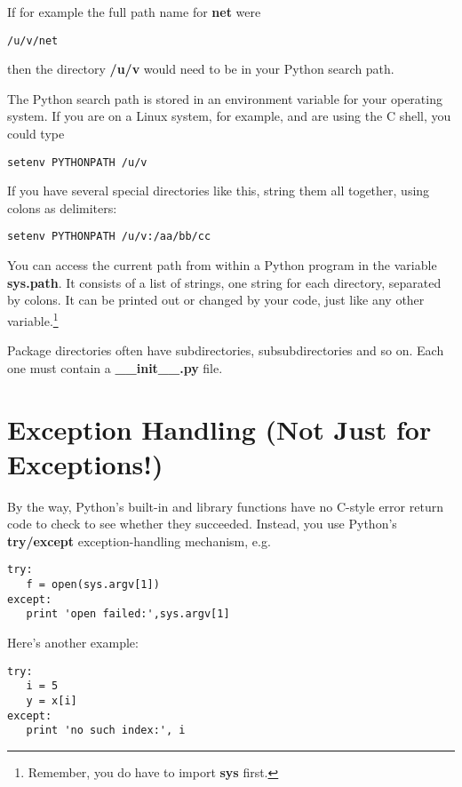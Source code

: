 If for example the full path name for {\bf net} were

\begin{Verbatim}[fontsize=\relsize{-2}]
/u/v/net
\end{Verbatim}

then the directory {\bf /u/v} would need to be in your Python search
path.  

The Python search path is stored in an environment variable for your
operating system.  If you are on a Linux system, for example, and are
using the C shell, you could type

\begin{Verbatim}[fontsize=\relsize{-2}]
setenv PYTHONPATH /u/v
\end{Verbatim}

If you have several special directories like this, string them all
together, using colons as delimiters:

\begin{Verbatim}[fontsize=\relsize{-2}]
setenv PYTHONPATH /u/v:/aa/bb/cc
\end{Verbatim}

You can access the current path from within a Python program in the
variable {\bf sys.path}.  It consists of a list of strings, one string
for each directory, separated by colons.  It can be printed out or
changed by your code, just like any other variable.\footnote{Remember,
you do have to import {\bf sys} first.}

Package directories often have subdirectories, subsubdirectories and so
on.  Each one must contain a {\bf \_\_init\_\_.py} file.  

\section{Exception Handling (Not Just for Exceptions!)}
\label{except}

By the way, Python's built-in and library functions have no C-style
error return code to check to see whether they succeeded.  Instead, you
use Python's {\bf try/except} exception-handling mechanism, e.g.

\begin{Verbatim}[fontsize=\relsize{-2}]
try:
   f = open(sys.argv[1])
except:
   print 'open failed:',sys.argv[1]
\end{Verbatim}

Here's another example:

\begin{Verbatim}[fontsize=\relsize{-2}]
try:
   i = 5
   y = x[i]
except:
   print 'no such index:', i
\end{Verbatim}

